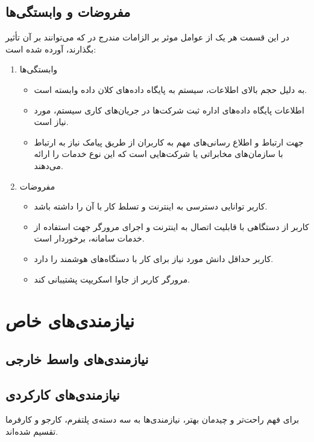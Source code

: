 \documentclass{report}
\begin{document}
			\subsection{مفروضات و وابستگی‌ها}
				در این قسمت هر یک از عوامل موثر بر الزامات مندرج در  که می‌توانند بر آن تأثیر بگذارند، آورده شده است:
				
				\begin{enumerate}
					\item وابستگی‌ها
					\begin{itemize}
						\item
						 به دلیل حجم بالای اطلاعات، سیستم به پایگاه داده‌های کلان داده وابسته است.
						\item
						 اطلاعات پایگاه داده‌های اداره ثبت شرکت‌ها در جریان‌های کاری سیستم، مورد نیاز است.
						\item 
						جهت ارتباط و اطلاع رسانی‌های مهم به کاربران از طریق پیامک نیاز به ارتباط با سازمان‌های مخابراتی یا شرکت‌هایی است که این نوع خدمات را ارائه می‌دهند.
					\end{itemize}
				
					\item مفروضات
					\begin{itemize}
						\item کاربر توانایی دسترسی به اینترنت و تسلط کار با آن را داشته باشد.
						\item کاربر از دستگاهی با قابلیت اتصال به اینترنت و اجرای مرورگر جهت استفاده از خدمات سامانه، برخوردار است.
						\item کاربر حداقل دانش مورد نیاز برای کار با دستگاه‌های هوشمند را دارد.
						\item مرورگر کاربر از جاوا اسکریپت پشتیبانی کند.
					\end{itemize}
				\end{enumerate}
			
		\section{نیازمندی‌های خاص}
			\subsection{نیازمندی‌های واسط خارجی}
			\subsection{نیازمندی‌های کارکردی}
			برای فهم راحت‌تر و چیدمان بهتر، نیازمندی‌ها به سه دسته‌ی پلتفرم، کارجو و کارفرما تقسیم شده‌اند.
			
\end{document}
